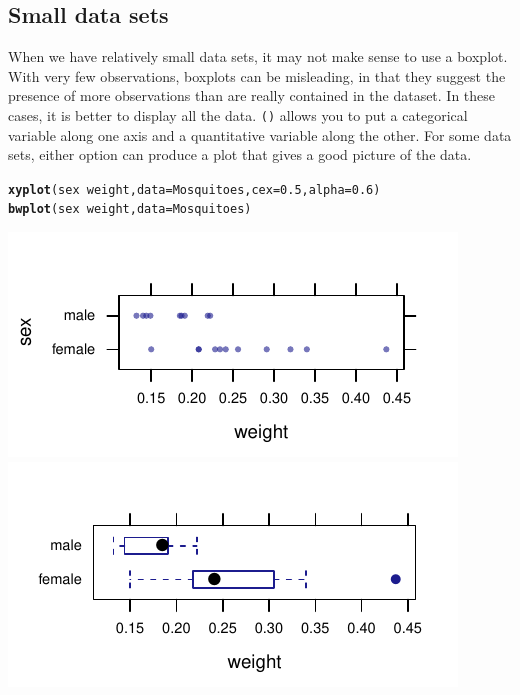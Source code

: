 \documentclass[twoside]{book}\usepackage[]{graphicx}\usepackage[]{xcolor}
\makeatletter
\def\maxwidth{ %
  \ifdim\Gin@nat@width>\linewidth
    \linewidth
  \else
    \Gin@nat@width
  \fi
}
\newcommand{\hlnum}[1]{\textcolor[rgb]{0.686,0.059,0.569}{#1}}%
\newcommand{\hlopt}[1]{\textcolor[rgb]{0,0,0}{#1}}%
\newcommand{\hlstd}[1]{\textcolor[rgb]{0.345,0.345,0.345}{#1}}%
\newcommand{\hlkwc}[1]{\textcolor[rgb]{0.333,0.667,0.333}{#1}}%
\newcommand{\hlkwd}[1]{\textcolor[rgb]{0.737,0.353,0.396}{\textbf{#1}}}%
\newenvironment{kframe}{%
 \def\at@end@of@kframe{}%
 \ifinner\ifhmode%
  \def\at@end@of@kframe{\end{minipage}}%
  \begin{minipage}{\columnwidth}%
 \fi\fi%
 \def\FrameCommand##1{\hskip\@totalleftmargin \hskip-\fboxsep
 \colorbox{shadecolor}{##1}\hskip-\fboxsep
     \hskip-\linewidth \hskip-\@totalleftmargin \hskip\columnwidth}%
 \MakeFramed {\advance\hsize-\width
   \@totalleftmargin\z@ \linewidth\hsize
   \@setminipage}}%
 {\par\unskip\endMakeFramed%
 \at@end@of@kframe}
\newenvironment{knitrout}{}{} %
\newcommand{\Rindex}[1]{\index{\texttt{#1}}}
\newcommand{\function}[1]{{\color{purple!75!blue}\texttt{\StrSubstitute{#1}{()}{}()}}\Rindex{#1}}
\makeatother
\begin{document}
\subsection{Small data sets}
When we have relatively small data sets, it may not make sense to use a boxplot.  With very few observations, boxplots can be misleading, in that they suggest the presence of more observations than are really contained in the dataset.  
In these cases, it is better to 
display all the data.  \function{xyplot()} allows you to put a categorical variable along one axis and a 
quantitative variable along the other.  
For some data sets, either option can produce a plot that gives a good picture
of the data.
\begin{knitrout}
\color{fgcolor}\begin{kframe}
\begin{alltt}
\hlkwd{xyplot}\hlstd{(sex} \hlopt{~} \hlstd{weight,} \hlkwc{data} \hlstd{= Mosquitoes,} \hlkwc{cex} \hlstd{=} \hlnum{0.5}\hlstd{,} \hlkwc{alpha} \hlstd{=} \hlnum{0.6}\hlstd{)}
\hlkwd{bwplot}\hlstd{(sex} \hlopt{~} \hlstd{weight,} \hlkwc{data} \hlstd{= Mosquitoes)}
\end{alltt}
\end{kframe}

{\centering \includegraphics[width=\maxwidth]{figures/fig-xyplot-quant-by-cat-1} 
\includegraphics[width=\maxwidth]{figures/fig-xyplot-quant-by-cat-2} 

}



\end{knitrout}
\end{document}
